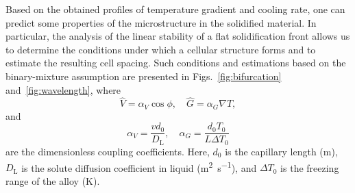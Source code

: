 \documentclass{article}
\newcommand{\liq}{\text{L}}
\begin{document}
Based on the obtained profiles of temperature gradient and cooling rate,
one can predict some properties of the microstructure in the solidified material.
In particular, the analysis of the linear stability of a flat solidification front allows us
to determine the conditions under which a cellular structure forms and to estimate the resulting cell spacing.
Such conditions and estimations based on the binary-mixture assumption are presented
in Figs.~\ref{fig:bifurcation} and~\ref{fig:wavelength}, where
\begin{equation}\label{eq:hatVG}
    \hat{V} = \alpha_V\cos\phi, \quad \hat{G} = \alpha_G\nabla{T},
\end{equation}
and
\begin{equation}\label{eq:alphaVG}
    \alpha_V = \frac{vd_0}{D_\liq}, \quad \alpha_G = \frac{d_0T_0}{L\Delta{T}_0}
\end{equation}
are the dimensionless coupling coefficients.
Here, $d_0$ is the capillary length (\si{\m}),
$D_\liq$ is the solute diffusion coefficient in liquid (\si{\m\squared\per\s}),
and $\Delta{T}_0$ is the freezing range of the alloy (\si{\K}).

\printbibliography
\end{document}
